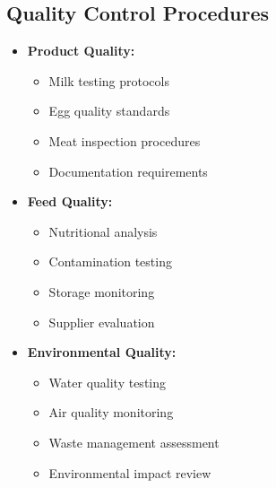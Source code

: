 \subsection{Quality Control Procedures}
\begin{itemize}
    \item \textbf{Product Quality:}
    \begin{itemize}
        \item Milk testing protocols
        \item Egg quality standards
        \item Meat inspection procedures
        \item Documentation requirements
    \end{itemize}
    
    \item \textbf{Feed Quality:}
    \begin{itemize}
        \item Nutritional analysis
        \item Contamination testing
        \item Storage monitoring
        \item Supplier evaluation
    \end{itemize}
    
    \item \textbf{Environmental Quality:}
    \begin{itemize}
        \item Water quality testing
        \item Air quality monitoring
        \item Waste management assessment
        \item Environmental impact review
    \end{itemize}
\end{itemize}

